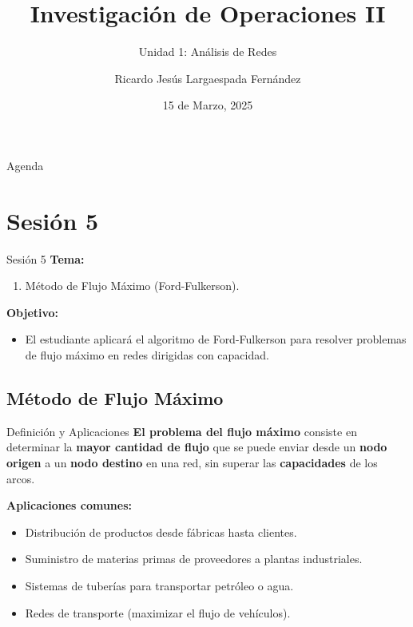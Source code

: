 \documentclass{beamer}
\title{Investigación de Operaciones II}
\subtitle{Unidad 1: Análisis de Redes}
\author{Ricardo Jesús Largaespada Fernández}
\institute{Ingeniería de Sistemas, DACTIC, UNI}
\date{15 de Marzo, 2025}
\begin{document}
\frame{\titlepage}

\begin{frame}{Agenda}
    \tableofcontents
\end{frame}

\section{Sesión 5}

\begin{frame}{Sesión 5}
\textbf{Tema:}
\begin{enumerate}
    \item Método de Flujo Máximo (Ford-Fulkerson).
\end{enumerate}

\textbf{Objetivo:}
\begin{itemize}
    \item El estudiante aplicará el algoritmo de Ford-Fulkerson para resolver problemas de flujo máximo en redes dirigidas con capacidad.
\end{itemize}
\end{frame}

\subsection{Método de Flujo Máximo}

\begin{frame}{Definición y Aplicaciones}
\textbf{El problema del flujo máximo} consiste en determinar la \textbf{mayor cantidad de flujo} que se puede enviar desde un \textbf{nodo origen} a un \textbf{nodo destino} en una red, sin superar las \textbf{capacidades} de los arcos.

\medskip
\textbf{Aplicaciones comunes:}
\begin{itemize}
    \item Distribución de productos desde fábricas hasta clientes.
    \item Suministro de materias primas de proveedores a plantas industriales.
    \item Sistemas de tuberías para transportar petróleo o agua.
    \item Redes de transporte (maximizar el flujo de vehículos).
\end{itemize}
\end{frame}
\end{document}
